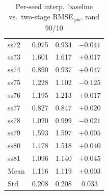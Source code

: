 \begin{table}[htbp]
{\begin{tabular}{lccc}
ss72 & 0.975 & 0.934 & $-0.041$ \\
ss73 & 1.601 & 1.617 & $+0.017$ \\
ss74 & 0.890 & 0.937 & $+0.047$ \\
ss75 & 1.228 & 1.102 & $-0.125$ \\
ss76 & 1.195 & 1.213 & $+0.017$ \\
ss77 & 0.827 & 0.847 & $+0.020$ \\
ss78 & 1.020 & 0.999 & $-0.021$ \\
ss79 & 1.593 & 1.597 & $+0.005$ \\
ss80 & 1.478 & 1.518 & $+0.040$ \\
ss81 & 1.096 & 1.140 & $+0.045$ \\
\midrule
Mean & 1.116 & 1.119 & $+0.003$ \\
Std  & 0.208 & 0.208 & 0.033 \\
\bottomrule
\end{tabular}}
\caption{Per-seed interp.\ baseline vs.\ two-stage RMSE\textsubscript{pw}, rand 90/10}
\label{tab:per_seed_trueobs_f90}
\end{table}

